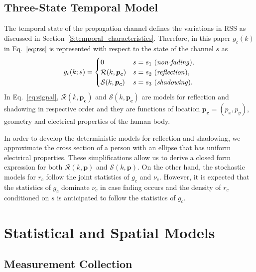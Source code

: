 \documentclass[journal, 10pt, twocolumn, balance]{IEEEtran}
\begin{document}
\subsection {Three-State Temporal Model}

The temporal state of the propagation channel defines the variations in RSS as discussed in Section~\ref{S:temporal_characteristics}. Therefore, in this paper $g_c(k)$ in Eq.~\eqref{eq:rss} is represented with respect to the state of the channel $s$ as
\begin{equation}\label{eq:signal}
    g_c(k;s) =  \begin{cases}
			       0 & s = s_1 \text{ (\emph{non-fading})}, \\
	\mathcal{R}(k, \bm{p_c}) & s = s_2 \text{ (\emph{reflection})}, \\
	\mathcal{S}(k, \bm{p_c}) & s = s_3 \text{ (\emph{shadowing})}. \\
               \end{cases}
\end{equation}
In Eq.~\eqref{eq:signal}, $\mathcal{R}(k, \bm{p_c})$ and $\mathcal{S}(k, \bm{p_c})$ are models for reflection and shadowing in respective order and they are functions of location $\bm{p_c} = (p_x, p_y)$, geometry and electrical properties of the human body.

In order to develop the deterministic models for reflection and shadowing, we approximate the cross section of a person with an ellipse that has uniform electrical properties. These simplifications allow us to derive a closed form expression for both $\mathcal{R}(k, \bm{p})$ and $\mathcal{S}(k, \bm{p})$. On the other hand, the stochastic models for $r_c$ follow the joint statistics of $g_c$ and $\nu_c$. However, it is expected that the statistics of $g_c$ dominate $\nu_c$ in case fading occurs and the density of $r_c$ conditioned on $s$ is anticipated to follow the statistics of $g_c$. 



\section{Statistical and Spatial Models} \label{S:spatial_models}
\subsection{ Measurement Collection}\label{sec:measurements_collection}
\end{document}
